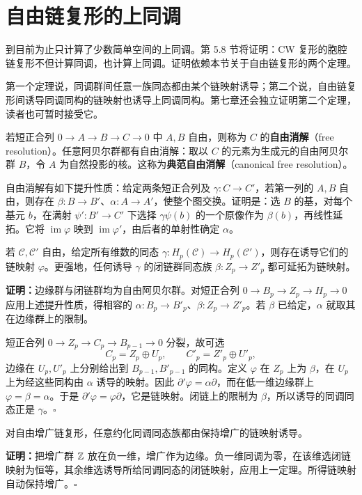 \section{自由链复形的上同调}
到目前为止只计算了少数简单空间的上同调。第 5.8 节将证明：CW 复形的胞腔链复形不但计算同调，也计算上同调。证明依赖本节关于自由链复形的两个定理。

第一个定理说，同调群间任意一族同态都由某个链映射诱导；第二个说，自由链复形间诱导同调同构的链映射也诱导上同调同构。第七章还会独立证明第二个定理，读者也可暂时接受它。

若短正合列 $0\to A\to B\to C\to0$ 中 $A,B$ 自由，则称为 $C$ 的\textbf{自由消解}（free resolution）。任意阿贝尔群都有自由消解：取以 $C$ 的元素为生成元的自由阿贝尔群 $B$，令 $A$ 为自然投影的核。这称为\textbf{典范自由消解}（canonical free resolution）。

自由消解有如下提升性质：给定两条短正合列及 $\gamma:C\to C'$，若第一列的 $A,B$ 自由，则存在 $\beta:B\to B'$、$\alpha:A\to A'$，使整个图交换。证明是：选 $B$ 的基，对每个基元 $b$，在满射 $\psi':B'\to C'$ 下选择 $\gamma\psi(b)$ 的一个原像作为 $\beta(b)$，再线性延拓。它将 $\operatorname{im}\varphi$ 映到 $\operatorname{im}\varphi'$，由后者的单射性确定 $\alpha$。

若 $\mathcal C,\mathcal C'$ 自由，给定所有维数的同态 $\gamma:H_p(\mathcal C)\to H_p(\mathcal C')$，则存在诱导它们的链映射 $\varphi$。更强地，任何诱导 $\gamma$ 的闭链群同态族 $\beta:Z_p\to Z'_p$ 都可延拓为链映射。

\textbf{证明：}边缘群与闭链群均为自由阿贝尔群。对短正合列 $0\to B_p\to Z_p\to H_p\to0$ 应用上述提升性质，得相容的 $\alpha:B_p\to B'_p$、$\beta:Z_p\to Z'_p$。若 $\beta$ 已给定，$\alpha$ 就取其在边缘群上的限制。

短正合列 $0\to Z_p\to C_p\to B_{p-1}\to0$ 分裂，故可选
\[
C_p=Z_p\oplus U_p,\qquad C'_p=Z'_p\oplus U'_p,
\]
边缘在 $U_p,U'_p$ 上分别给出到 $B_{p-1},B'_{p-1}$ 的同构。定义 $\varphi$ 在 $Z_p$ 上为 $\beta$，在 $U_p$ 上为经这些同构由 $\alpha$ 诱导的映射。因此 $\partial'\varphi=\alpha\partial$，而在低一维边缘群上 $\varphi=\beta=\alpha$。于是 $\partial'\varphi=\varphi\partial$，它是链映射。闭链上的限制为 $\beta$，所以诱导的同调同态正是 $\gamma$。\hfill$\square$

对自由增广链复形，任意约化同调同态族都由保持增广的链映射诱导。

\textbf{证明：}把增广群 $\mathbb{Z}$ 放在负一维，增广作为边缘。负一维同调为零，在该维选闭链映射为恒等，其余维选诱导所给同调同态的闭链映射，应用上一定理。所得链映射自动保持增广。\hfill$\square$

